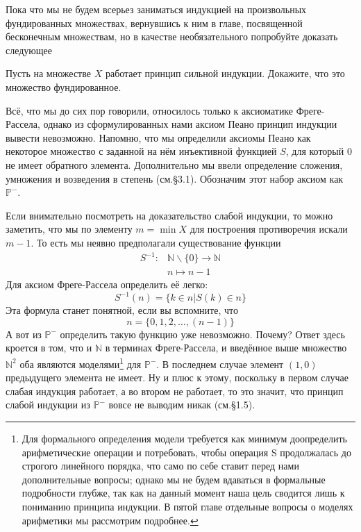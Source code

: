 Пока что мы не будем всерьез заниматься индукцией на произвольных фундированных множествах, вернувшись к ним в главе, посвященной бесконечным множествам, но в качестве необязательного попробуйте доказать следующее

\begin{exercise}
Пусть на множестве $X$ работает принцип сильной индукции. Докажите, что это множество фундированное.
\end{exercise}

Всё, что мы до сих пор говорили, относилось только к аксиоматике Фреге-Рассела, однако из сформулированных нами аксиом Пеано принцип индукции вывести невозможно. Напомню, что мы определили аксиомы Пеано как некоторое множество с заданной на нём инъективной функцией $S$, для который 0 не имеет обратного элемента. Дополнительно мы ввели определение сложения, умножения и возведения в степень (см.\S3.1). Обозначим этот набор аксиом как $\mathbb{P}^-$.

Если внимательно посмотреть на доказательство слабой индукции, то можно заметить, что мы по элементу $m=\min X$ для построения противоречия искали  $m-1$. То есть мы неявно предполагали существование функции
\begin{align*}
S^{-1}: & \mathbb{N}\backslash\{0\} \to \mathbb{N}\\
    & n \mapsto n-1
\end{align*}
Для аксиом Фреге-Рассела определить её легко:
$$S^{-1}(n) = \{k \in n | S(k) \in n\}$$
Эта формула станет понятной, если вы вспомните, что
$$n = \{0, 1, 2, \ldots, (n-1)\}$$
А вот из $\mathbb{P}^-$ определить такую функцию уже невозможно. Почему? Ответ здесь кроется в том, что и $\mathbb{N}$ в терминах Фреге-Рассела, и введённое выше множество $\mathbb{N}^2$ оба являются моделями\footnote{Для формального определения модели требуется как минимум доопределить арифметические операции и потребовать, чтобы операция S продолжалась до строгого линейного порядка, что само по себе ставит перед нами дополнительные вопросы; однако мы не будем вдаваться в формальные подробности глубже, так как на данный момент наша цель сводится лишь к пониманию принципа индукции. В пятой главе отдельные вопросы о моделях арифметики мы рассмотрим подробнее.} для $\mathbb{P}^-$. В последнем случае элемент $(1, 0)$ предыдущего элемента не имеет. Ну и плюс к этому, поскольку в первом случае слабая индукция работает, а во втором не работает, то это значит, что принцип слабой индукции из $\mathbb{P}^-$ вовсе не выводим никак (см.\S1.5).

